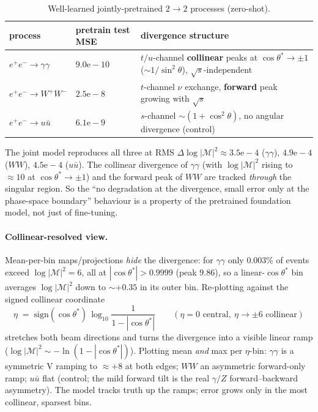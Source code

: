 \begin{table}[h]
\centering
\caption{Well-learned jointly-pretrained $2\to2$ processes (zero-shot).}
\begin{tabular}{lll}
\hline
process & pretrain test MSE & divergence structure \\
\hline
$e^+e^-\to\gamma\gamma$ & $9.0\mathrm{e}{-}10$ & $t/u$-channel \textbf{collinear} peaks
  at $\cos\theta^*\to\pm1$ ($\sim1/\sin^2\theta$), $\sqrt{s}$-independent \\
$e^+e^-\to W^+W^-$ & $2.5\mathrm{e}{-}8$ & $t$-channel $\nu$ exchange,
  \textbf{forward} peak growing with $\sqrt{s}$ \\
$e^+e^-\to u\bar u$ & $6.1\mathrm{e}{-}9$ & $s$-channel $\sim(1+\cos^2\theta)$,
  no angular divergence (control) \\
\hline
\end{tabular}
\end{table}

The joint model reproduces all three at RMS $\Delta\log|\mathcal{M}|^2 \approx
3.5\mathrm{e}{-}4$ ($\gamma\gamma$), $4.9\mathrm{e}{-}4$ ($WW$), $4.5\mathrm{e}{-}4$
($u\bar u$).  The collinear divergence of $\gamma\gamma$ (with $\log|\mathcal{M}|^2$
rising to $\approx10$ at $\cos\theta^*\to\pm1$) and the forward peak of $WW$ are
tracked \emph{through} the singular region.  So the ``no degradation at the
divergence, small error only at the phase-space boundary'' behaviour is a property of
the pretrained foundation model, not just of fine-tuning.

\paragraph{Collinear-resolved view.}  Mean-per-bin maps/projections \emph{hide} the
divergence: for $\gamma\gamma$ only $0.003\%$ of events exceed $\log|\mathcal{M}|^2=6$,
all at $|\cos\theta^*|>0.9999$ (peak $9.86$), so a linear-$\cos\theta^*$ bin averages
$\log|\mathcal{M}|^2$ down to $\sim+0.35$ in its outer bin.  Re-plotting against the
signed collinear coordinate
\[
  \eta \;=\; \mathrm{sign}(\cos\theta^*)\,
             \log_{10}\!\frac{1}{1-|\cos\theta^*|}
  \qquad(\eta=0\text{ central},\ \eta\to\pm6\text{ collinear})
\]
stretches both beam directions and turns the divergence into a visible linear ramp
($\log|\mathcal{M}|^2 \sim -\ln(1-|\cos\theta^*|)$).  Plotting mean \emph{and} max per
$\eta$-bin: $\gamma\gamma$ is a symmetric V ramping to $\approx+8$ at both edges; $WW$
an asymmetric forward-only ramp; $u\bar u$ flat (control; the mild forward tilt is the
real $\gamma/Z$ forward--backward asymmetry).  The model tracks truth up the ramps;
error grows only in the most collinear, sparsest bins.

